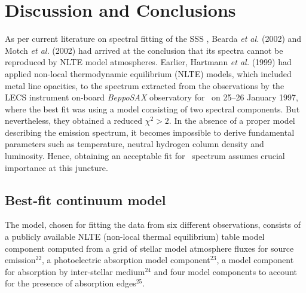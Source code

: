 \section{Discussion and Conclusions}
	As per current literature on spectral fitting of the SSS \source, Bearda \textit{et al.} (2002) and Motch \textit{et al.} (2002) had arrived at the conclusion that its spectra cannot be reproduced by NLTE model atmospheres. %
	Earlier, Hartmann \textit{et al.} (1999) had applied non-local thermodynamic equilibrium (NLTE) models, which included metal line opacities, to the spectrum extracted from the observations by the LECS instrument on-board \textit{BeppoSAX} observatory for \source\ on 25--26 January 1997, %
	where the best fit was using a model consisting of two spectral components. But nevertheless, they obtained a reduced $\chi^2>2$. In the absence of a proper model describing the emission spectrum, it becomes impossible to derive fundamental parameters such as temperature, neutral hydrogen column density and luminosity. %
	Hence, obtaining an acceptable fit for \source\ spectrum assumes crucial importance at this juncture.
%			
	
	\subsection{Best-fit continuum model}
	The model, chosen for fitting the data from six different observations, consists of a publicly available NLTE (non-local thermal equilibrium) table model component computed from a grid of stellar model atmosphere fluxes for source emission$^{22}$, a photoelectric absorption model component$^{23}$, a model component for absorption by inter-stellar medium$^{24}$ and four model components to account for the presence of absorption edges$^{25}$.
	
